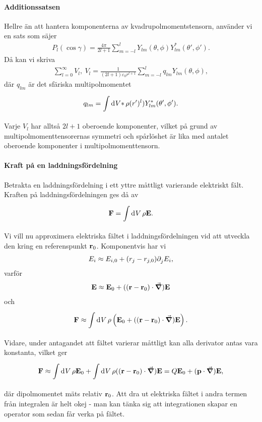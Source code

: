 \paragraph{Additionssatsen}
Hellre än att hantera komponenterna av kvadrupolmomentstensorn, använder vi en sats som säjer
\begin{align*}
	P_{l}(\cos{\gamma}) = \frac{4\pi}{2l + 1}\sum\limits_{m = -l}^{l}Y_{lm}(\theta, \phi)Y_{lm}^{*}(\theta', \phi').
\end{align*}
Då kan vi skriva
\begin{align*}
	\sum\limits_{l = 0}^{\infty}V_{l},\ V_{l} = \frac{1}{(2l + 1)\varepsilon_{0}r^{l + 1}}\sum\limits_{m = -l}^{l}q_{lm}Y_{lm}(\theta, \phi),
\end{align*}
där $q_{lm}$ är det sfäriska multipolmomentet
\begin{align*}
	q_{lm} = \int\limits_{}^{}\dd[]{V*}\rho (r')^{l})Y_{lm}^{*}(\theta', \phi').
\end{align*}
Varje $V_{l}$ har alltså $2l + 1$ oberoende komponenter, vilket på grund av multipolmomenttensorernas symmetri och spårlöshet är lika med antalet oberoende komponenter i multipolmomenttensorn.

\paragraph{Kraft på en laddningsfördelning}
Betrakta en laddningsfördelning i ett yttre måttligt varierande elektriskt fält. Kraften på laddningsfördelningen ges då av
\begin{align*}
	\vb{F} = \int\limits_{}^{}\dd[]{V}\rho\vb{E}.
\end{align*}
Vi vill nu approximera elektriska fältet i laddningsfördelningen vid att utveckla den kring en referenspunkt $\vb{r}_{0}$. Komponentvis har vi
\begin{align*}
	E_{i} \approx E_{i, 0} + (r_{j} - r_{j, 0})\partial_{j}^{}E_{i},
\end{align*}
varför
\begin{align*}
	\vb{E} \approx \vb{E}_{0} + ((\vb{r} - \vb{r}_{0})\cdot\grad)\vb{E}
\end{align*}
och
\begin{align*}
	\vb{F} \approx \int\limits_{}^{}\dd[]{V}\rho\left(\vb{E}_{0} + ((\vb{r} - \vb{r}_{0})\cdot\grad)\vb{E}\right).
\end{align*}
Vidare, under antagandet att fältet varierar måttligt kan alla derivator antas vara konstanta, vilket ger
\begin{align*}
	\vb{F} \approx \int\limits_{}^{}\dd[]{V}\rho\vb{E}_{0} + \int\limits_{}^{}\dd[]{V}\rho((\vb{r} - \vb{r}_{0})\cdot\grad)\vb{E} = Q\vb{E}_{0} + (\vb{p}\cdot\grad)\vb{E},
\end{align*}
där dipolmomentet mäts relativ $\vb{r}_{0}$. Att dra ut elektriska fältet i andra termen från integralen är helt okej - man kan tänka sig att integrationen skapar en operator som sedan får verka på fältet.

